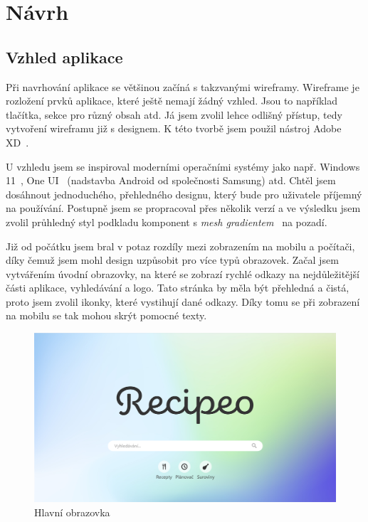 
\chapter{Návrh}

\section{Vzhled aplikace}

Při navrhování aplikace se většinou začíná s takzvanými wireframy. Wireframe je rozložení prvků aplikace, které ještě
nemají žádný vzhled. Jsou to například tlačítka, sekce pro různý obsah atd. Já jsem zvolil lehce odlišný přístup, tedy
vytvoření wireframu již s designem. K této tvorbě jsem použil nástroj Adobe XD~\cite{AdobeXD}.

U vzhledu jsem se inspiroval moderními operačními systémy jako např. Windows 11~\cite{Windows11}, One UI~\cite{OneUI}
(nadstavba Android od společnosti Samsung) atd.
Chtěl jsem dosáhnout jednoduchého, přehledného designu, který bude pro uživatele příjemný na používání. Postupně jsem se
propracoval přes několik verzí a ve výsledku jsem zvolil průhledný styl podkladu komponent s \emph{mesh gradientem}~\cite{MeshGradients} na pozadí.

Již od počátku jsem bral v potaz rozdíly mezi zobrazením na mobilu a počítači, díky čemuž jsem mohl design uzpůsobit
pro více typů obrazovek. Začal jsem vytvářením úvodní obrazovky, na které se zobrazí rychlé odkazy na nejdůležitější části
aplikace, vyhledávání a logo. Tato stránka by měla být přehledná a čistá, proto jsem zvolil ikonky, které vystihují dané
odkazy. Díky tomu se při zobrazení na mobilu se tak mohou skrýt pomocné texty.

\begin{figure}[H]
    \includegraphics[width=\textwidth]{images/main-page}
    \caption{Hlavní obrazovka} \label{picture:recipeo:main-page}
\end{figure}

